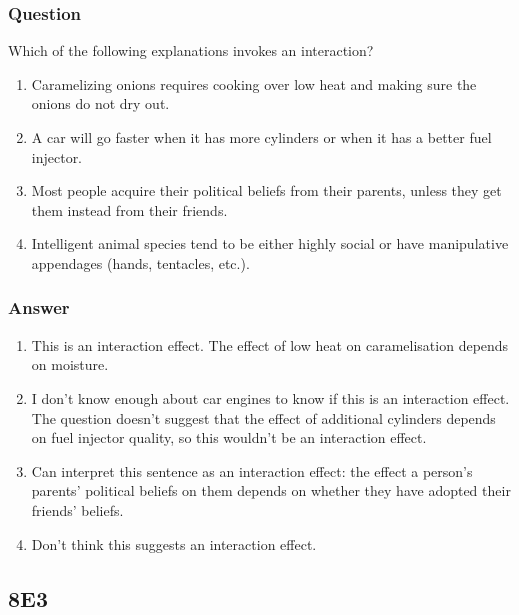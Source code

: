 \documentclass[
]{book}
\begin{document}
\hypertarget{question-76}{%
\subsubsection*{Question}\label{question-76}}

Which of the following explanations invokes an interaction?

\begin{enumerate}
\def\labelenumi{\arabic{enumi}.}
\item
  Caramelizing onions requires cooking over low heat and making sure the onions do not dry out.
\item
  A car will go faster when it has more cylinders or when it has a better fuel injector.
\item
  Most people acquire their political beliefs from their parents, unless they get them instead from their friends.
\item
  Intelligent animal species tend to be either highly social or have manipulative appendages (hands, tentacles, etc.).
\end{enumerate}

\hypertarget{answer-76}{%
\subsubsection*{Answer}\label{answer-76}}

\begin{enumerate}
\def\labelenumi{\arabic{enumi}.}
\item
  This is an interaction effect. The effect of low heat on caramelisation depends on moisture.
\item
  I don't know enough about car engines to know if this is an interaction effect. The question doesn't suggest that the effect of additional cylinders depends on fuel injector quality, so this wouldn't be an interaction effect.
\item
  Can interpret this sentence as an interaction effect: the effect a person's parents' political beliefs on them depends on whether they have adopted their friends' beliefs.
\item
  Don't think this suggests an interaction effect.
\end{enumerate}

\hypertarget{e3-6}{%
\subsection*{8E3}\label{e3-6}}
\end{document}
